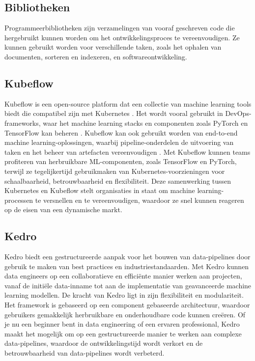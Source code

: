 \subsection{Bibliotheken}
Programmeerbibliotheken zijn verzamelingen van vooraf geschreven code die hergebruikt kunnen worden om het ontwikkelingsproces te vereenvoudigen. Ze kunnen gebruikt worden voor verschillende taken, zoals het ophalen van documenten, sorteren en indexeren, en softwareontwikkeling.
\subsection{Kubeflow}
Kubeflow is een open-source platform dat een collectie van machine learning tools biedt die compatibel zijn met Kubernetes \autocite{Stein2020}. Het wordt vooral gebruikt in DevOps-frameworks, waar het machine learning stacks en componenten zoals PyTorch en TensorFlow kan beheren \autocite{NGC2021}.
Kubeflow kan ook gebruikt worden van end-to-end machine learning-oplossingen, waarbij pipeline-onderdelen de uitvoering van taken en het beheer van artefacten vereenvoudigen \autocite{Bisong2019}.
Met Kubeflow kunnen teams profiteren van herbruikbare ML-componenten, zoals TensorFlow en PyTorch, terwijl ze tegelijkertijd gebruikmaken van Kubernetes-voorzieningen voor schaalbaarheid, betrouwbaarheid en flexibiliteit. Deze samenwerking tussen Kubernetes en Kubeflow stelt organisaties in staat om machine learning-processen te versnellen en te vereenvoudigen, waardoor ze snel kunnen reageren op de eisen van een dynamische markt.
\subsection{Kedro}
Kedro biedt een gestructureerde aanpak voor het bouwen van data-pipelines door gebruik te maken van best practices en industriestandaarden. Met Kedro kunnen data engineers op een collaboratieve en efficiënte manier werken aan projecten, vanaf de initiële data-inname tot aan de implementatie van geavanceerde machine learning modellen.
De kracht van Kedro ligt in zijn flexibiliteit en modulariteit. Het framework is gebaseerd op een component gebaseerde architectuur, waardoor gebruikers gemakkelijk herbruikbare en onderhoudbare code kunnen creëren. Of je nu een beginner bent in data engineering of een ervaren professional, Kedro maakt het mogelijk om op een gestructureerde manier te werken aan complexe data-pipelines, waardoor de ontwikkelingstijd wordt verkort en de betrouwbaarheid van data-pipelines wordt verbeterd.
